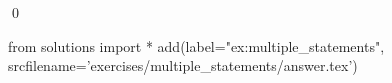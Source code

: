 
\begin{ex} 
  \label{ex:multiple_statements}
  
  \qed
\end{ex} 
\begin{python0}
from solutions import *
add(label="ex:multiple_statements",
    srcfilename='exercises/multiple_statements/answer.tex') 
\end{python0}
